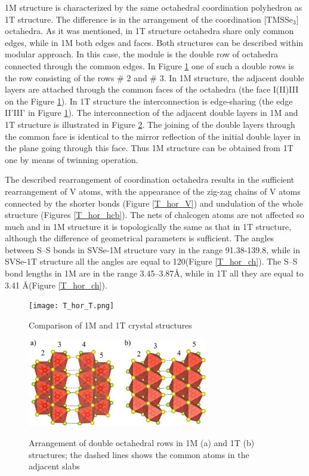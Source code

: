 \documentclass[a4paperm]{article}
\begin{document}
1M structure is characterized by the same octahedral coordination polyhedron as 1T structure.
The difference is in the arrangement of the coordination [TMSSe$_3$] octahedra.
As it was mentioned, in 1T structure octahedra share only common edges, while in 1M both edges and faces.
Both structures can be described within modular approach.
In this case, the module is the double row of octahedra connected through the common edges.
In Figure \ref{T_hor_T} one of such a double rows is the row consisting of the rows \# 2 and \# 3.
In 1M structure, the adjacent double layers are attached through the common faces  of the octahedra (the face I(II)III on the Figure \ref{T_hor_T}).
In 1T structure the interconnection is edge-sharing (the edge II'III' in Figure \ref{T_hor_T}). 
The interconnection of the adjacent double layers in 1M and 1T structure is illustrated in  Figure \ref{T_hor_slabs}.
The joining of the double layers through the common face is identical to the mirror reflection of the initial double layer in the plane going through this face.
Thus 1M structure can be obtained from 1T one by means of twinning operation.


The described rearrangement of coordination octahedra results in the sufficient rearrangement of V atoms, with the appearance of the zig-zag chains of V atoms connected by the shorter bonds (Figure \ref{T_hor_V}) and undulation of the whole structure (Figures \ref{T_hor_hcb}).
The nets of chalcogen atoms are not affected so much and in 1M structure it is topologically the same as that in 1T structure, although the difference of geometrical parameters is sufficient.
The angles between S--S bonds in SVSe-1M structure vary in the range 91.38-139.8\textdegree, while in SVSe-1T structure all the angles are equal to 120\textdegree (Figure \ref{T_hor_ch}).
The S--S bond lengths in 1M are in the range 3.45--3.87\AA, while in 1T all they are equal to 3.41 \AA (Figure \ref{T_hor_ch}).


\begin{figure}[H]
	\texttt{[image: T\_hor\_T.png]} \\
	\caption{Comparison of 1M and 1T crystal structures}
	\label{T_hor_T}
\end{figure}

\begin{figure}[H]
	\includegraphics[width=0.7\textwidth]{T_hor_slabs.png} \\
	\caption{Arrangement of double octahedral rows in 1M (a) and 1T (b) structures; the dashed lines shows the common atoms in the adjacent slabs}
	\label{T_hor_slabs}
\end{figure}
\end{document}
